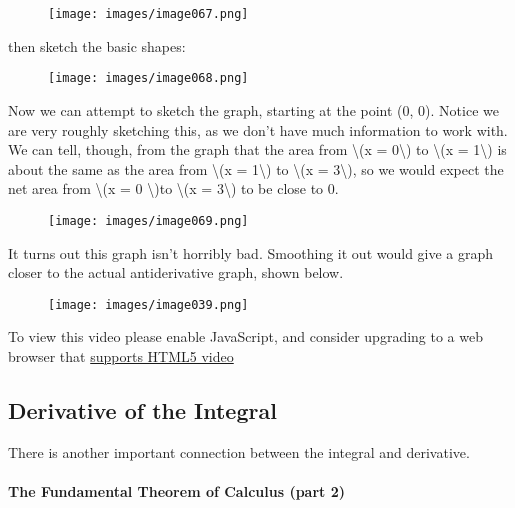 \begin{figure}
\centering
\texttt{[image: images/image067.png]}
\caption{}
\end{figure}

then sketch the basic shapes:

\begin{figure}
\centering
\texttt{[image: images/image068.png]}
\caption{}
\end{figure}

Now we can attempt to sketch the graph, starting at the point (0, 0).
Notice we are very roughly sketching this, as we don't have much
information to work with. We can tell, though, from the graph that the
area from \textbackslash{}(x = 0\textbackslash{}) to \textbackslash{}(x
= 1\textbackslash{}) is about the same as the area from
\textbackslash{}(x = 1\textbackslash{}) to \textbackslash{}(x =
3\textbackslash{}), so we would expect the net area from
\textbackslash{}(x = 0 \textbackslash{})to \textbackslash{}(x =
3\textbackslash{}) to be close to 0.

\begin{figure}
\centering
\texttt{[image: images/image069.png]}
\caption{}
\end{figure}

It turns out this graph isn't horribly bad. Smoothing it out would give
a graph closer to the actual antiderivative graph, shown below.

\begin{figure}
\centering
\texttt{[image: images/image039.png]}
\caption{}
\end{figure}

To view this video please enable JavaScript, and consider upgrading to a
web browser that \href{http://videojs.com/html5-video-support/}{supports
HTML5 video}

\hypertarget{derivative-of-the-integral}{%
\subsection{Derivative of the
Integral}\label{derivative-of-the-integral}}

There is another important connection between the integral and
derivative.

\hypertarget{the-fundamental-theorem-of-calculus-part-2}{%
\paragraph{The Fundamental Theorem of Calculus (part
2)}\label{the-fundamental-theorem-of-calculus-part-2}}

